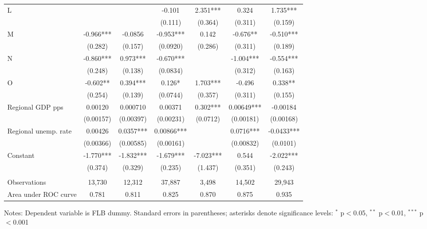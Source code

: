 \begin{threeparttable}
\begin{tabular}{l*{6}{S}}
\quad L                   &            &           & -0.101     & 2.351***  & 0.324      & 1.735***   \\
                          &            &           & (0.111)    & (0.364)   & (0.311)    & (0.159)    \\[0.5ex]

\quad M                   &  -0.966*** & -0.0856   & -0.953***  & 0.142     & -0.676**   & -0.510***  \\
                          &  (0.282)   & (0.157)   & (0.0920)   & (0.286)   & (0.311)    & (0.189)    \\[0.5ex]

\quad N                   &  -0.860*** & 0.973***  & -0.670***  &           & -1.004***  & -0.554***  \\
                          &  (0.248)   & (0.138)   & (0.0834)   &           & (0.312)    & (0.163)    \\[0.5ex]

\quad O                   &  -0.602**  & 0.394***  & 0.126*     & 1.703***  & -0.496     & 0.338**    \\
                          &  (0.254)   & (0.139)   & (0.0744)   & (0.357)   & (0.311)    & (0.155)    \\[0.5ex]

Regional GDP pps          &  0.00120   & 0.000710  & 0.00371    & 0.302***  & 0.00649*** & -0.00184   \\
                          &  (0.00157) & (0.00397) & (0.00231)  & (0.0712)  & (0.00181)  & (0.00168)  \\[0.5ex]

Regional unemp. rate      &  0.00426   & 0.0357*** & 0.00866*** &           & 0.0716***  & -0.0433*** \\
                          &  (0.00366) & (0.00585) & (0.00161)  &           & (0.00832)  & (0.0101)   \\[0.5ex]


Constant                  &  -1.770*** & -1.832*** & -1.679***  & -7.023*** & 0.544      & -2.022***  \\
                          &  (0.374)   & (0.329)   & (0.235)    & (1.437)   & (0.351)    & (0.243)    \\
                          &            &           &            &           &            &            \\
\midrule
Observations              &  13,730    & 12,312    & 37,887     & 3,498     & 14,502     & 29,943     \\
Area under ROC curve      &  0.781     & 0.811     & 0.825      & 0.870     & 0.875      & 0.935      \\
\bottomrule
\end{tabular}
%
\begin{tablenotes}
\item Notes: Dependent variable is FLB dummy. Standard errors in parentheses; asterisks denote significance levels: $^{*}$ p$<$0.05, $^{**}$ p$<$0.01, $^{***}$ p$<$0.001
\end{tablenotes}

\end{threeparttable}
